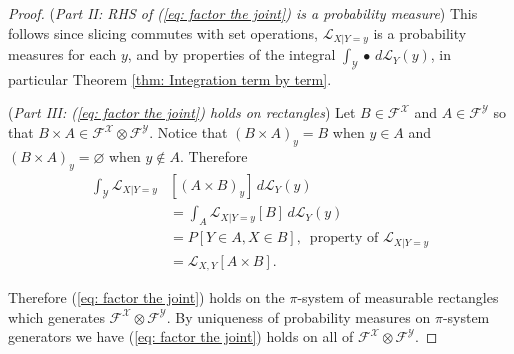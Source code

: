 \begin{proof}
({\sl Part  II: RHS of (\ref{eq: factor the joint}) is a probability measure}) This follows since slicing commutes with set operations, $\mathcal L_{X|Y=y}$ is a probability measures for each $y$, and by properties of the integral $\int_{\mathcal Y} \bullet \,d\mathcal L_Y(y)$, in particular Theorem \ref{thm: Integration term by term}.

({\sl Part  III: (\ref{eq: factor the joint}) holds on rectangles})
Let $B\in \mathcal F^{\mathcal X}$ and $A\in \mathcal F^{\mathcal Y}$ so that $B\times A \in \mathcal F^{\mathcal X}\otimes \mathcal F^{\mathcal Y}$. Notice that $(B\times A)_y = B$ when $y\in A$ and $(B\times A)_y = \varnothing$ when $y\notin A$. Therefore
\begin{align*}
\int_{\mathcal Y} \mathcal L_{X|Y=y}&[(A\times B)_y] \,d\mathcal L_Y(y) \\
& = \int_{A} \mathcal L_{X|Y=y}[B] \,d\mathcal L_Y(y)\\
& = P[Y\in A, X\in B],\,\text{ property of $\mathcal L_{X|Y=y}$}\\
& = \mathcal L_{X,Y}[A\times B].
\end{align*}

Therefore  (\ref{eq: factor the joint}) holds on the $\pi$-system of measurable rectangles which generates $\mathcal F^{\mathcal X}\otimes \mathcal F^{\mathcal Y}$. By uniqueness of probability measures on $\pi$-system generators we have  (\ref{eq: factor the joint}) holds on all of $\mathcal F^{\mathcal X}\otimes \mathcal F^{\mathcal Y}$.

\end{proof}


